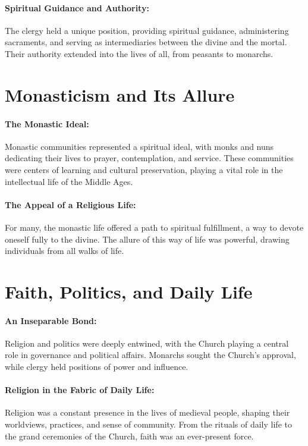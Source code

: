 \documentclass[a4paper,12pt]{book}
\begin{document}
\paragraph{Spiritual Guidance and Authority:}
The clergy held a unique position, providing spiritual guidance, administering sacraments, and serving as intermediaries between the divine and the mortal. Their authority extended into the lives of all, from peasants to monarchs.

\section*{Monasticism and Its Allure}

\paragraph{The Monastic Ideal:}
Monastic communities represented a spiritual ideal, with monks and nuns dedicating their lives to prayer, contemplation, and service. These communities were centers of learning and cultural preservation, playing a vital role in the intellectual life of the Middle Ages.

\paragraph{The Appeal of a Religious Life:}
For many, the monastic life offered a path to spiritual fulfillment, a way to devote oneself fully to the divine. The allure of this way of life was powerful, drawing individuals from all walks of life.

\section*{Faith, Politics, and Daily Life}

\paragraph{An Inseparable Bond:}
Religion and politics were deeply entwined, with the Church playing a central role in governance and political affairs. Monarchs sought the Church’s approval, while clergy held positions of power and influence.

\paragraph{Religion in the Fabric of Daily Life:}
Religion was a constant presence in the lives of medieval people, shaping their worldviews, practices, and sense of community. From the rituals of daily life to the grand ceremonies of the Church, faith was an ever-present force.
\end{document}

